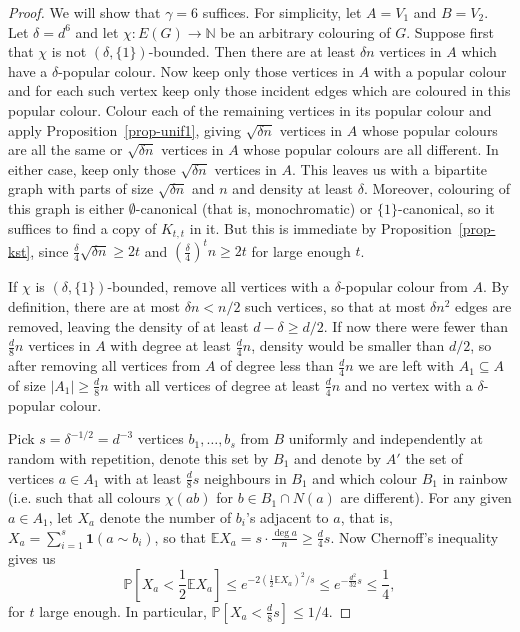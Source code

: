 \documentclass[11pt]{article}
\theoremstyle{plain}
\theoremstyle{definition}
\newcommand{\N}{\mathbb{N}}
\newcommand{\bicmpltt}[2]{K_{#1,#2}}
\newcommand{\bicmplt}[1]{\bicmpltt{#1}{#1}}
\newcommand{\expect}{\mathbb{E}}
\newcommand{\prob}{\mathbb{P}}
\newcommand{\one}{\mathbf{1}}
\begin{document}
\begin{proof}
    We will show that $\gamma=6$ suffices. For simplicity, let $A=V_1$ and $B=V_2$. Let $\delta=d^{6}$ and let $\chi:E(G)\to\N$ be an arbitrary colouring of $G$. Suppose first that $\chi$ is not $(\delta,\{1\})$-bounded. Then there are at least $\delta n$ vertices in $A$ which have a $\delta$-popular colour. Now keep only those vertices in $A$ with a popular colour and for each such vertex keep only those incident edges which are coloured in this popular colour. Colour each of the remaining vertices in its popular colour and apply Proposition~\ref{prop-unif1}, giving $\sqrt{\delta n}$ vertices in $A$ whose popular colours are all the same or $\sqrt{\delta n}$ vertices in $A$ whose popular colours are all different. In either case, keep only those $\sqrt{\delta n}$ vertices in $A$. This leaves us with a bipartite graph with parts of size $\sqrt{\delta n}$ and $n$ and density at least $\delta$. Moreover, colouring of this graph is either $\emptyset$-canonical (that is, monochromatic) or $\{1\}$-canonical, so it suffices to find a copy of $\bicmplt{t}$ in it. But this is immediate by Proposition~\ref{prop-kst}, since $\frac{\delta}{4}\sqrt{\delta n}\ge 2t$ and $\left(\frac{\delta}{4}\right)^t n\ge 2t$ for large enough $t$.

    If $\chi$ is $(\delta,\{1\})$-bounded, remove all vertices with a $\delta$-popular colour from $A$. By definition, there are at most $\delta n<n/2$ such vertices, so that at most $\delta n^2$ edges are removed, leaving the density of at least $d-\delta\ge d/2$. If now there were fewer than $\frac{d}{8}n$ vertices in $A$ with degree at least $\frac{d}{4}n$, density would be smaller than $d/2$, so after removing all vertices from $A$ of degree less than $\frac{d}{4}n$ we are left with $A_1\subseteq A$ of size $|A_1|\ge\frac{d}{8}n$ with all vertices of degree at least $\frac{d}{4}n$ and no vertex with a $\delta$-popular colour.

    Pick $s=\delta^{-1/2}=d^{-3}$ vertices $b_1,\dots,b_s$ from $B$ uniformly and independently at random with repetition, denote this set by $B_1$ and denote by $A'$ the set of vertices $a\in A_1$ with at least $\frac{d}{8}s$ neighbours in $B_1$ and which colour $B_1$ in rainbow (i.e. such that all colours $\chi(ab)$ for $b\in B_1\cap N(a)$ are different). For any given $a\in A_1$, let $X_a$ denote the number of $b_i$'s adjacent to $a$, that is, $X_a=\sum_{i=1}^s \one(a\sim b_i)$, so that $\expect X_a=s\cdot\frac{\deg a}{n}\ge\frac{d}{4}s$. Now Chernoff's inequality gives us
    $$\prob\left[X_a<\frac{1}{2}\expect X_a\right]\le e^{-2(\frac{1}{2}\expect X_a)^2/s}\le e^{-\frac{d^2}{32}s}\le\frac{1}{4},$$
    for $t$ large enough. In particular, $\prob[X_a<\frac{d}{8}s]\le1/4$.
    

\end{proof}
\end{document}
